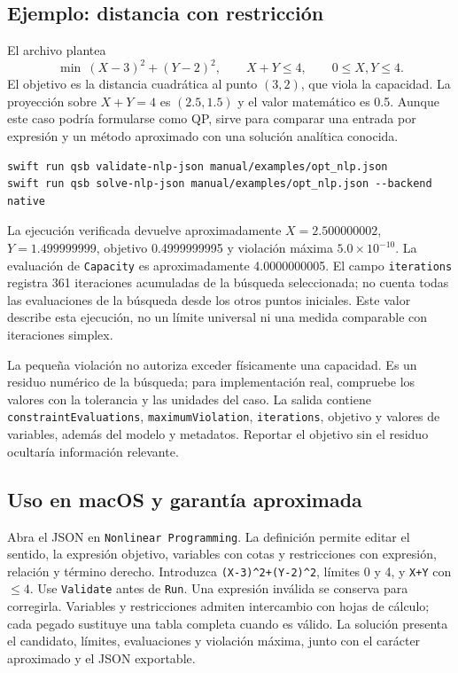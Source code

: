 \subsection{Ejemplo: distancia con restricción}
El archivo  plantea
\[
 \min\ (X-3)^2+(Y-2)^2,\qquad X+Y\leq4,\qquad0\leq X,Y\leq4.
\]
El objetivo es la distancia cuadrática al punto \((3,2)\), que viola la
capacidad. La proyección sobre \(X+Y=4\) es \((2.5,1.5)\) y el valor
matemático es 0.5. Aunque este caso podría formularse como QP, sirve para
comparar una entrada por expresión y un método aproximado con una solución
analítica conocida.
\begin{lstlisting}
swift run qsb validate-nlp-json manual/examples/opt_nlp.json
swift run qsb solve-nlp-json manual/examples/opt_nlp.json --backend native
\end{lstlisting}
La ejecución verificada devuelve aproximadamente
\(X=2.500000002\), \(Y=1.499999999\), objetivo 0.4999999995 y violación
máxima \(5.0\times10^{-10}\). La evaluación de \texttt{Capacity} es
aproximadamente 4.0000000005. El campo \texttt{iterations} registra 361 iteraciones acumuladas de la
búsqueda seleccionada; no cuenta todas las evaluaciones de la búsqueda desde
los otros puntos iniciales. Este valor describe esta ejecución, no un límite
universal ni una medida comparable con iteraciones simplex.

La pequeña violación no autoriza exceder físicamente una capacidad. Es un
residuo numérico de la búsqueda; para implementación real, compruebe los
valores con la tolerancia y las unidades del caso. La salida contiene
\texttt{constraintEvaluations}, \texttt{maximumViolation},
\texttt{iterations}, objetivo y valores de variables, además del modelo y
metadatos. Reportar el objetivo sin el residuo ocultaría información relevante.

\subsection{Uso en macOS y garantía aproximada}
Abra el JSON en \texttt{Nonlinear Programming}. La definición permite editar
el sentido, la expresión objetivo, variables con cotas y restricciones con
expresión, relación y término derecho. Introduzca
\texttt{(X-3)\^{}2+(Y-2)\^{}2}, límites 0 y 4, y \texttt{X+Y} con
\(\leq4\). Use \texttt{Validate} antes de \texttt{Run}. Una expresión inválida
se conserva para corregirla. Variables y restricciones admiten intercambio
con hojas de cálculo; cada pegado sustituye una tabla completa cuando es válido.
La solución presenta el candidato, límites, evaluaciones y violación máxima,
junto con el carácter aproximado y el JSON exportable.

